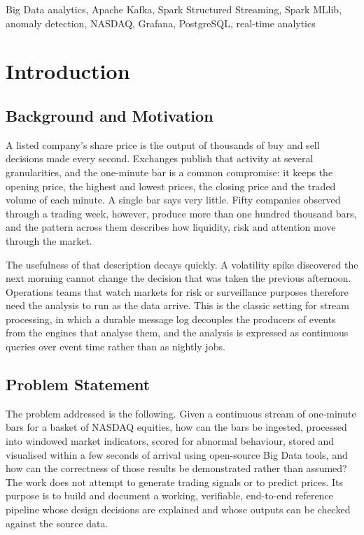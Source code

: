 \documentclass[conference]{IEEEtran}
\begin{document}
\begin{IEEEkeywords}
Big Data analytics, Apache Kafka, Spark Structured Streaming, Spark MLlib, anomaly detection, NASDAQ, Grafana, PostgreSQL, real-time analytics
\end{IEEEkeywords}

\section{Introduction}

\subsection{Background and Motivation}
A listed company's share price is the output of thousands of buy and sell decisions made every second. Exchanges publish that activity at several granularities, and the one-minute bar is a common compromise: it keeps the opening price, the highest and lowest prices, the closing price and the traded volume of each minute. A single bar says very little. Fifty companies observed through a trading week, however, produce more than one hundred thousand bars, and the pattern across them describes how liquidity, risk and attention move through the market.

The usefulness of that description decays quickly. A volatility spike discovered the next morning cannot change the decision that was taken the previous afternoon. Operations teams that watch markets for risk or surveillance purposes therefore need the analysis to run as the data arrive. This is the classic setting for stream processing, in which a durable message log decouples the producers of events from the engines that analyse them, and the analysis is expressed as continuous queries over event time rather than as nightly jobs.

\subsection{Problem Statement}
The problem addressed is the following. Given a continuous stream of one-minute bars for a basket of NASDAQ equities, how can the bars be ingested, processed into windowed market indicators, scored for abnormal behaviour, stored and visualised within a few seconds of arrival using open-source Big Data tools, and how can the correctness of those results be demonstrated rather than assumed? The work does not attempt to generate trading signals or to predict prices. Its purpose is to build and document a working, verifiable, end-to-end reference pipeline whose design decisions are explained and whose outputs can be checked against the source data.
\end{document}
